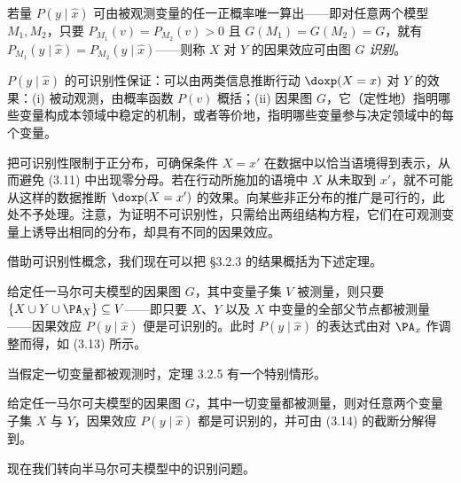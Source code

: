 \begin{definition}[因果效应的可识别性]
若量 $P(y\mid\hat{x})$ 可由被观测变量的任一正概率唯一算出——即对任意两个模型 $M_1,M_2$，只要 $P_{M_1}(v)=P_{M_2}(v)>0$ 且 $G(M_1)=G(M_2)=G$，就有 $P_{M_1}(y\mid\hat{x})=P_{M_2}(y\mid\hat{x})$——则称 $X$ 对 $Y$ 的因果效应可由图 $G$ \emph{识别}。
\end{definition}

$P(y\mid\hat{x})$ 的可识别性保证：可以由两类信息推断行动 $\doxp(X=x)$ 对 $Y$ 的效果：(i) 被动观测，由概率函数 $P(v)$ 概括；(ii) 因果图 $G$，它（定性地）指明哪些变量构成本领域中稳定的机制，或者等价地，指明哪些变量参与决定领域中的每个变量。

把可识别性限制于正分布，可确保条件 $X=x'$ 在数据中以恰当语境得到表示，从而避免 \textup{(3.11)} 中出现零分母。若在行动所施加的语境中 $X$ 从未取到 $x'$，就不可能从这样的数据推断 $\doxp(X=x')$ 的效果。向某些非正分布的推广是可行的，此处不予处理。注意，为证明不可识别性，只需给出两组结构方程，它们在可观测变量上诱导出相同的分布，却具有不同的因果效应。

借助可识别性概念，我们现在可以把 \S 3.2.3 的结果概括为下述定理。

\begin{theorem}
给定任一马尔可夫模型的因果图 $G$，其中变量子集 $V$ 被测量，则只要 $\{X\cup Y\cup\PA_X\}\subseteq V$——即只要 $X$、$Y$ 以及 $X$ 中变量的全部父节点都被测量——因果效应 $P(y\mid\hat{x})$ 便是可识别的。此时 $P(y\mid\hat{x})$ 的表达式由对 $\PA_x$ 作调整而得，如 \textup{(3.13)} 所示。
\end{theorem}

当假定一切变量都被观测时，定理 3.2.5 有一个特别情形。

\begin{corollary}
给定任一马尔可夫模型的因果图 $G$，其中一切变量都被测量，则对任意两个变量子集 $X$ 与 $Y$，因果效应 $P(y\mid\hat{x})$ 都是可识别的，并可由 \textup{(3.14)} 的截断分解得到。
\end{corollary}

现在我们转向半马尔可夫模型中的识别问题。
